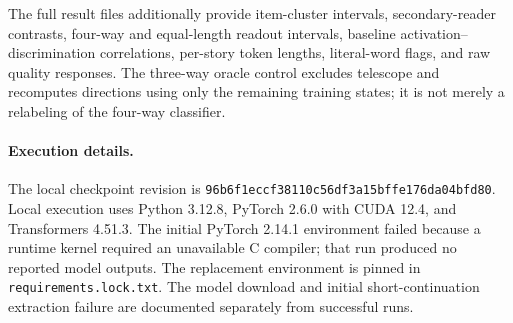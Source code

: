 \begin{table}[t]
\centering\small
\caption{Position and missingness diagnostics in percent except missing-call counts. Agreement means selecting the same underlying text after reversal, not the same displayed letter. ``Sonnet A'' is the fraction of calls selecting displayed A. Mini bounds assign missing order judgments adversarially; they are not sampling intervals.}
\end{table}
\begin{table}[t]
\centering\small
\caption{Behavioral text lengths and automated quality diagnostics. Quality scores are means over 30 predetermined stories per cell; all coherence and fluency scores hit the scale ceiling. Prompt tokens exclude chat-template tokens. No behavioral output is truncated.}
\end{table}
\begin{table}[t]
\centering\small
\caption{Four-way centroid readout accuracy (\%) by centering method, decoder layer, and continuation token. Chance is 25\%. Neutral-paired and secret-centered modes use matched counterfactual runs. The latter is an oracle diagnostic. All conditions share 12 held-out continuations and four secret labels; repeated positions are not independent data.}
\end{table}
\begin{table}[t]
\centering\small
\caption{Exploratory supervised linear readout (\%) with fixed regularization and a held-out continuation split. Chance is 25\% for four-way and 33.3\% for equal-token-length three-way classification. These results do not imply that the secret is explicitly maintained rather than reread from the prompt.}
\end{table}


The full result files additionally provide item-cluster intervals, secondary-reader contrasts, four-way and equal-length readout intervals, baseline activation--discrimination correlations, per-story token lengths, literal-word flags, and raw quality responses. The three-way oracle control excludes telescope and recomputes directions using only the remaining training states; it is not merely a relabeling of the four-way classifier.

\paragraph{Execution details.}
The local checkpoint revision is \texttt{96b6f1eccf38110c56df3a15bffe176da04bfd80}. Local execution uses Python 3.12.8, PyTorch 2.6.0 with CUDA 12.4, and Transformers 4.51.3. The initial PyTorch 2.14.1 environment failed because a runtime kernel required an unavailable C compiler; that run produced no reported model outputs. The replacement environment is pinned in \texttt{requirements.lock.txt}. The model download and initial short-continuation extraction failure are documented separately from successful runs.

